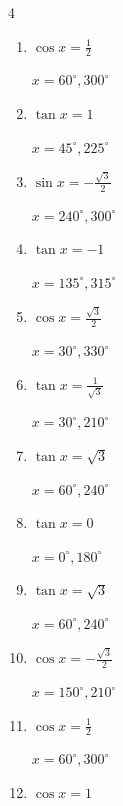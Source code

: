 \begin{multicols}{4}
\begin{enumerate}
        $\displaystyle x = 60^{\circ} , 240^{\circ}$

  \item $\displaystyle \cos{x}  = \frac{1}{2}$

        $\displaystyle x = 60^{\circ} , 300^{\circ}$

  \item $\displaystyle \tan{x}  = 1$

        $\displaystyle x = 45^{\circ} , 225^{\circ}$

  \item $\displaystyle \sin{x}  = -\frac{\sqrt{3}}{2}$

        $\displaystyle x = 240^{\circ} , 300^{\circ}$

  \item $\displaystyle \tan{x}  = -1$

        $\displaystyle x = 135^{\circ} , 315^{\circ}$

  \item $\displaystyle \cos{x}  = \frac{\sqrt{3}}{2}$

        $\displaystyle x = 30^{\circ} , 330^{\circ}$

  \item $\displaystyle \tan{x}  = \frac{1}{\sqrt{3}}$

        $\displaystyle x = 30^{\circ} , 210^{\circ}$

  \item $\displaystyle \tan{x}  = \sqrt{3}$

        $\displaystyle x = 60^{\circ} , 240^{\circ}$

  \item $\displaystyle \tan{x}  = 0$

        $\displaystyle x = 0^{\circ} , 180^{\circ}$

  \item $\displaystyle \tan{x}  = \sqrt{3}$

        $\displaystyle x = 60^{\circ} , 240^{\circ}$

\columnbreak %

  \item $\displaystyle \cos{x}  = -\frac{\sqrt{3}}{2}$

        $\displaystyle x = 150^{\circ} , 210^{\circ}$

  \item $\displaystyle \cos{x}  = \frac{1}{2}$

        $\displaystyle x = 60^{\circ} , 300^{\circ}$

  \item $\displaystyle \cos{x}  = 1$


\end{enumerate}
\end{multicols}

